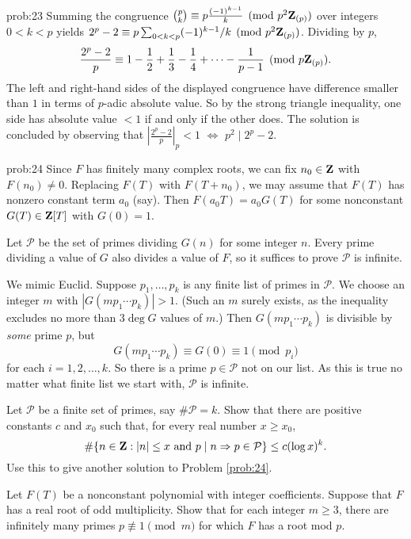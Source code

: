 \begin{sol}{prob:23} Summing the congruence $\binom{p}{k} \equiv p \frac{(-1)^{k-1}}{k}\pmod{p^2\mathbf{Z}_{(p)}}$ over integers $0 < k < p$ yields $2^p-2 \equiv p \sum_{0 < k < p} (-1)^{k-1}/k \pmod{p^2 \mathbf{Z}_{(p)}}$. Dividing by $p$,
\[ \frac{2^p-2}{p} \equiv 1-\frac{1}{2}+\frac{1}{3}-\frac{1}{4}+\dots-\frac{1}{p-1} \pmod{p\mathbf{Z}_{(p)}}. \]
The left and right-hand sides of the displayed congruence have difference smaller than $1$ in terms of $p$-adic absolute value. So by the strong triangle inequality, one side has absolute value $<1$ if and only if the other does. The solution is concluded by observing that $|\frac{2^p-2}{p}|_p < 1$ $\Longleftrightarrow$ $p^2 \mid 2^p-2$.
\end{sol}

\begin{sol}{prob:24} Since $F$ has finitely many complex roots, we can fix $n_0 \in \mathbf{Z}$ with $F(n_0) \ne 0$. Replacing $F(T)$ with $F(T+n_0)$, we may assume that $F(T)$ has nonzero constant term $a_0$ (say). Then $F(a_0 T) = a_0 G(T)$ for some nonconstant $G(T) \in \mathbf{Z}[T]$ with $G(0)=1$.

Let $\mathcal{P}$ be the set of primes dividing $G(n)$ for some integer $n$. Every prime dividing a value of $G$ also divides a value of $F$, so it suffices to prove $\mathcal{P}$ is infinite.

We mimic Euclid. Suppose $p_1,\dots,p_k$ is any finite list of primes in $\mathcal{P}$. We choose an integer $m$ with $|G(mp_1\cdots p_k)|>1$. (Such an $m$ surely exists, as the inequality excludes no more than $3\deg{G}$ values of $m$.) Then $G(mp_1\cdots p_k)$ is divisible by \emph{some} prime $p$, but
\[ G(m p_1\cdots p_k) \equiv G(0) \equiv 1 \pmod{p_i} \]
for each $i=1,2,\dots, k$. So there is a prime $p\in \mathcal{P}$ not on our list. As this is true no matter what finite list we start with, $\mathcal{P}$ is infinite.
\end{sol}

\begin{challenge} Let $\mathcal{P}$ be a finite set of primes, say $\#\mathcal{P}=k$. Show that there are positive constants $c$ and $x_0$ such that, for every real number $x\ge x_0$,
\[ \#\{n \in \mathbf{Z}: |n|\le x\text{ and } p\mid n \Rightarrow p \in \mathcal{P}\} \le c (\log x)^{k}. \]
Use this to give another solution to Problem \ref{prob:24}.
\end{challenge}


\begin{challenge} Let $F(T)$ be a nonconstant polynomial with integer coefficients. Suppose that $F$ has a real root of odd multiplicity. Show that for each integer $m\ge 3$, there are infinitely many primes $p\not\equiv1\pmod{m}$ for which $F$ has a root mod $p$.
\end{challenge}

